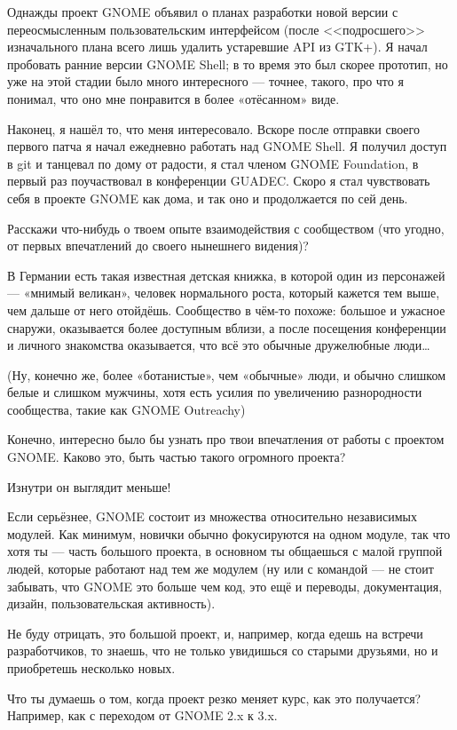 \documentclass[10pt, a5paper]{article}
\begin{document}
\begin{Parallel}[p]{}{}
{Однажды проект GNOME объявил о планах разработки новой версии с переосмысленным пользовательским интерфейсом (после <<подросшего>> изначального плана всего лишь удалить устаревшие API из GTK+). Я начал пробовать ранние версии GNOME Shell; в то время это был скорее прототип, но уже на этой стадии было много интересного — точнее, такого, про что я понимал, что оно мне понравится в более «отёсанном» виде.

Наконец, я нашёл то, что меня интересовало. Вскоре после отправки своего первого патча я начал ежедневно работать над GNOME Shell. Я получил доступ в git и танцевал по дому от радости, я стал членом GNOME Foundation, в первый раз поучаствовал в конференции GUADEC. Скоро я стал чувствовать себя в проекте GNOME как дома, и так оно и продолжается по сей день.

\q Расскажи что-нибудь о твоем опыте взаимодействия с сообществом (что угодно, от первых впечатлений до своего нынешнего видения)?

\a В Германии есть такая известная детская книжка, в которой один из персонажей — «мнимый великан», человек нормального роста, который кажется тем выше, чем дальше от него отойдёшь. Сообщество в чём-то похоже: большое и ужасное снаружи, оказывается более доступным вблизи, а после посещения конференции и личного знакомства оказывается, что всё это обычные дружелюбные люди…

(Ну, конечно же, более «ботанистые», чем «обычные» люди, и обычно слишком белые и слишком мужчины, хотя есть усилия по увеличению разнородности сообщества, такие как GNOME Outreachy\fakefootnote{})

\q Конечно, интересно было бы узнать про твои впечатления от работы с проектом GNOME. Каково это, быть частью такого огромного проекта?

\a Изнутри он выглядит меньше!

Если серьёзнее, GNOME состоит из множества относительно независимых модулей. Как минимум, новички обычно фокусируются на одном модуле, так что хотя ты — часть большого проекта, в основном ты общаешься с малой группой людей, которые работают над тем же модулем (ну или с командой --- не стоит забывать, что GNOME это больше чем код, это ещё и переводы, документация, дизайн, пользовательская активность).

Не буду отрицать, это большой проект, и, например, когда едешь на встречи разработчиков, то знаешь, что не только увидишься со старыми друзьями, но и приобретешь несколько новых.

\q Что ты думаешь о том, когда проект резко меняет курс, как это получается? Например, как с переходом от GNOME 2.x к 3.x. 

}
\end{Parallel}
\end{document}

